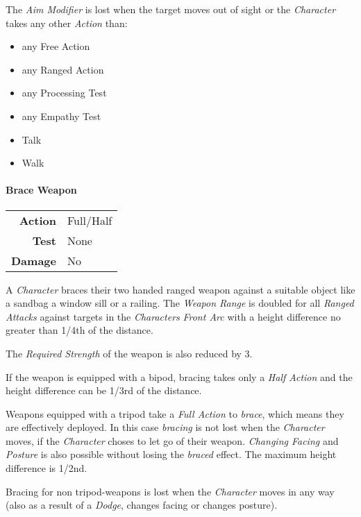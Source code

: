 The \emph{Aim Modifier} is lost when the target moves out of
sight or the \emph{Character} takes any other \emph{Action} than:

\begin{itemize}[parsep=0em]
    \item any Free Action
    \item any Ranged Action
    \item any Processing Test
    \item any Empathy Test
    \item Talk
    \item Walk
\end{itemize}

\paragraph{Brace Weapon}
\begin{tabular}{rl}
    \textbf{Action} & Full/Half \\
    \textbf{Test}   & None      \\
    \textbf{Damage} & No        \\
\end{tabular}

\hfill

A \emph{Character} braces their two handed ranged weapon against a suitable
object like a sandbag a window sill or a railing. The \emph{Weapon Range} is
doubled for all \emph{Ranged Attacks} against targets in the \emph{Characters}
\emph{Front Arc} with a height difference no greater than 1/4th of the distance.

The \emph{Required Strength} of the weapon is also reduced by 3.

If the weapon is equipped with a bipod, bracing takes only a \emph{Half Action}
and the height difference can be 1/3rd of the distance.

Weapons equipped with a tripod take a \emph{Full Action} to \emph{brace},
which means they are effectively deployed. In this case \emph{bracing} is not
lost when the \emph{Character} moves, if the \emph{Character} choses to let go of
their weapon. \emph{Changing Facing} and \emph{Posture} is also possible without
losing the \emph{braced} effect. The maximum height difference is 1/2nd.

Bracing for non tripod-weapons is lost when the \emph{Character} moves in any way
(also as a result of a \emph{Dodge}, changes facing or changes posture).

